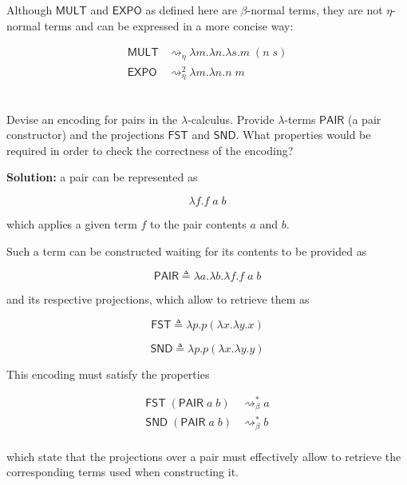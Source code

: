 \documentclass{article}
\begin{document}
Although $\mathsf{MULT}$ and $\mathsf{EXPO}$ as defined here 
are $\beta$-normal terms, they are not $\eta$-normal terms 
and can be expressed in a more concise way:

\begin{align*}
  \mathsf{MULT} &\rightsquigarrow_\eta 
    \lambda m.\lambda n.\lambda s. 
      m\;(n\;s) \\
  \mathsf{EXPO} &\rightsquigarrow_\eta^2
    \lambda m.\lambda n.
      n\;m \\
\end{align*}

\subsection{}\label{ex:8}

Devise an encoding for pairs in the $\lambda$-calculus. 
Provide $\lambda$-terms $\mathsf{PAIR}$ (a pair constructor)
and the projections $\mathsf{FST}$ and $\mathsf{SND}$. What 
properties would be required in order to check the correctness
of the encoding?

\textbf{Solution:} a pair can be represented as

$$
\lambda f.f\;a\;b
$$

which applies a given term $f$ to the pair contents $a$ and $b$.

Such a term can be constructed waiting for its contents to be 
provided as

$$
\mathsf{PAIR} 
  \triangleq \lambda a.\lambda b.\lambda f. 
    f\;a\;b
$$

and its respective projections, which allow to retrieve them as

$$
\mathsf{FST} 
  \triangleq \lambda p. 
    p (\lambda x.\lambda y.x)
$$

$$
\mathsf{SND} 
  \triangleq \lambda p. 
    p (\lambda x.\lambda y.y)
$$

This encoding must satisfy the properties

\begin{align*}
  \mathsf{FST}\;(\mathsf{PAIR}\;a\;b)
    &\rightsquigarrow^*_\beta a \\ 
  \mathsf{SND}\;(\mathsf{PAIR}\;a\;b)
    &\rightsquigarrow^*_\beta b \\
\end{align*}

which state that the projections over a pair must effectively 
allow to retrieve the corresponding terms used when 
constructing it.
\end{document}
